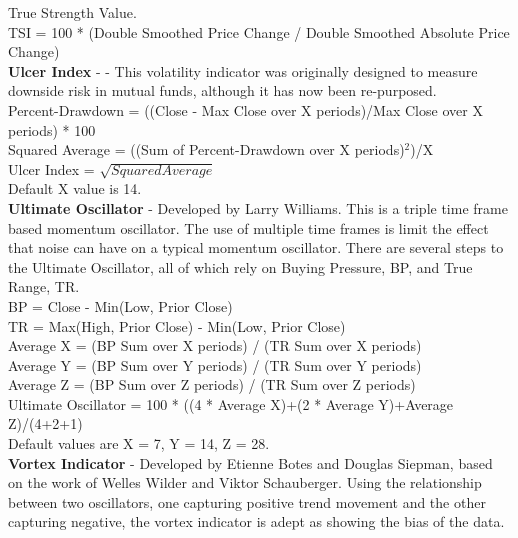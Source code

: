 \documentclass[conference]{IEEEtran}
\begin{document}
\noindent
True Strength Value.\\
TSI = 100 * (Double Smoothed Price Change / Double Smoothed Absolute Price Change)\\

\noindent
\textbf{Ulcer Index} - \cite{Martin1992} - This volatility indicator was originally designed to measure downside risk in mutual funds, although it has now been re-purposed.  \\

\noindent
Percent-Drawdown = ((Close - Max Close over X periods)/Max Close over X periods) * 100\\
Squared Average = ((Sum of Percent-Drawdown over X periods)$^2$)/X\\
Ulcer Index = $\sqrt{Squared Average}$\\
Default X value is 14.\\

\noindent
\textbf{Ultimate Oscillator} - Developed by Larry Williams. This is a triple time frame based momentum oscillator. The use of multiple time frames is limit the effect that noise can have on a typical momentum oscillator. There are several steps to the Ultimate Oscillator, all of which rely on Buying Pressure, BP, and True Range, TR.\\

\noindent
BP = Close - Min(Low, Prior Close)\\
TR = Max(High, Prior Close)  -  Min(Low, Prior Close)\\

\noindent
Average X = (BP Sum over X periods) / (TR Sum over X periods)\\
Average Y = (BP Sum over Y periods) / (TR Sum over Y periods)\\
Average Z = (BP Sum over Z periods) / (TR Sum over Z periods)\\

\noindent
Ultimate Oscillator = 100 * ((4 * Average X)+(2 * Average Y)+Average Z)/(4+2+1)\\
Default values are X = 7, Y = 14, Z = 28.\\

\noindent
\textbf{Vortex Indicator} - Developed by Etienne Botes and Douglas Siepman, based on the work of Welles Wilder and Viktor Schauberger. Using the relationship between two oscillators, one capturing positive trend movement and the other capturing negative, the vortex indicator is adept as showing the bias of the data.\\
\end{document}
